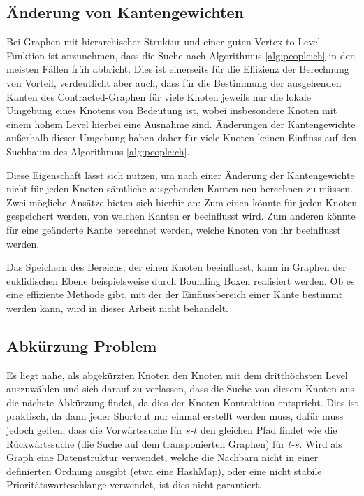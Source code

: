 \subsection{Änderung von Kantengewichten}

Bei Graphen mit hierarchischer Struktur und einer guten Vertex-to-Level-Funktion ist anzunehmen, dass die Suche nach Algorithmus \ref{alg:people:ch}  in den meisten Fällen früh abbricht.
Dies ist einerseits für die Effizienz der Berechnung von Vorteil, verdeutlicht aber auch, dass für die Bestimmung der ausgehenden Kanten des Contracted-Graphen für viele Knoten jeweils nur die lokale Umgebung eines Knotens von Bedeutung ist, wobei insbesondere Knoten mit einem hohem Level hierbei eine Ausnahme sind.
Änderungen der Kantengewichte außerhalb dieser Umgebung haben daher für viele Knoten keinen Einfluss auf den Suchbaum des Algorithmus \ref{alg:people:ch}.

Diese Eigenschaft lässt sich nutzen, um nach einer Änderung der Kantengewichte nicht für jeden Knoten sämtliche ausgehenden Kanten neu berechnen zu müssen.
Zwei mögliche Ansätze bieten sich hierfür an:
Zum einen könnte für jeden Knoten gespeichert werden, von welchen Kanten er beeinflusst wird.
Zum anderen könnte für eine geänderte Kante berechnet werden, welche Knoten von ihr beeinflusst werden.

Das Speichern des Bereichs, der einen Knoten beeinflusst, kann in Graphen der euklidischen Ebene beispielsweise durch Bounding Boxen realisiert werden. Ob es eine effiziente Methode gibt, mit der der Einflussbereich einer Kante bestimmt werden kann, wird in dieser Arbeit nicht behandelt.

\subsection{Abkürzung Problem}

Es liegt nahe, als abgekürzten Knoten den Knoten mit dem dritthöchsten Level auszuwählen und sich darauf zu verlassen, dass die Suche von diesem Knoten aus die nächste Abkürzung findet, da dies der Knoten-Kontraktion entspricht.
Dies ist praktisch, da dann jeder Shortcut nur einmal erstellt werden muss, dafür muss jedoch gelten, dass die Vorwärtssuche für $s$-$t$ den gleichen Pfad findet wie die Rückwärtssuche (die Suche auf dem transponierten Graphen) für $t$-$s$.
Wird als Graph eine Datenstruktur verwendet, welche die Nachbarn nicht in einer definierten Ordnung ausgibt (etwa eine HashMap), oder eine nicht stabile Prioritätswarteschlange verwendet, ist dies nicht garantiert.

